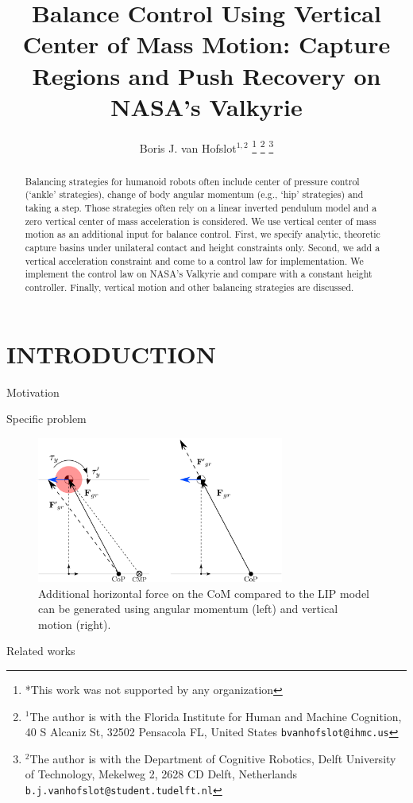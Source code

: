 \documentclass[letterpaper, 10 pt, conference]{ieeeconf}  %
\title{\LARGE \bf
Balance Control Using Vertical Center of Mass Motion: Capture Regions and Push Recovery on NASA's Valkyrie
}
\author{Boris J. van Hofslot$^{1,2}$%
\thanks{*This work was not supported by any organization}%
\thanks{$^{1}$The author is with the Florida Institute for Human and Machine Cognition, 40 S Alcaniz St, 32502 Pensacola FL, United States
        {\tt\small bvanhofslot@ihmc.us}}%
\thanks{$^{2}$The author is with the Department of Cognitive Robotics, Delft University of Technology, Mekelweg 2, 2628 CD Delft, Netherlands
        {\tt\small b.j.vanhofslot@student.tudelft.nl}}%
}
\begin{document}
\maketitle
\thispagestyle{empty}
\pagestyle{empty}


\begin{abstract}

Balancing strategies for humanoid robots often include center of pressure control (`ankle' strategies), change of body angular momentum (e.g., `hip' strategies) and taking a step. Those strategies often rely on a linear inverted pendulum model and a zero vertical center of mass acceleration is considered. We use vertical center of mass motion as an additional input for balance control. First, we specify analytic, theoretic capture basins under unilateral contact and height constraints only. Second, we add a vertical acceleration constraint and come to a control law for implementation. We implement the control law on NASA's Valkyrie and compare with a constant height controller. Finally, vertical motion and other balancing strategies are discussed.

\end{abstract}


\section{INTRODUCTION}
Motivation

Specific problem
\begin{figure}[h]
      \centering
      \includegraphics[width=3.2in]{modelvarzvsang2.png}
      \caption{Additional horizontal force on the CoM compared to the LIP model can be generated using angular momentum (left) and vertical motion (right). }
      \label{fig:angvsvarz}
\end{figure}

Related works  \cite{koolen2016balance}
\end{document}
